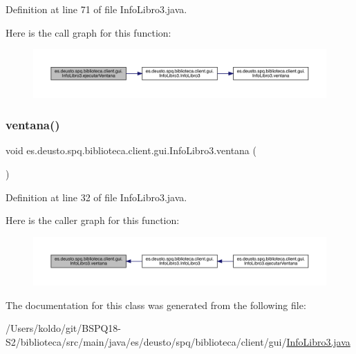 Definition at line 71 of file Info\+Libro3.\+java.

Here is the call graph for this function\+:
\nopagebreak
\begin{figure}[H]
\begin{center}
\leavevmode
\includegraphics[width=350pt]{classes_1_1deusto_1_1spq_1_1biblioteca_1_1client_1_1gui_1_1_info_libro3_a688fb88d1ba1c2b6fb5e48e786dfd0e4_cgraph}
\end{center}
\end{figure}
\mbox{\label{classes_1_1deusto_1_1spq_1_1biblioteca_1_1client_1_1gui_1_1_info_libro3_a923986e267f32a335e7d675c68926277}} 
\subsubsection{\texorpdfstring{ventana()}{ventana()}}
{\footnotesize\ttfamily void es.\+deusto.\+spq.\+biblioteca.\+client.\+gui.\+Info\+Libro3.\+ventana (\begin{DoxyParamCaption}{ }\end{DoxyParamCaption})}



Definition at line 32 of file Info\+Libro3.\+java.

Here is the caller graph for this function\+:
\nopagebreak
\begin{figure}[H]
\begin{center}
\leavevmode
\includegraphics[width=350pt]{classes_1_1deusto_1_1spq_1_1biblioteca_1_1client_1_1gui_1_1_info_libro3_a923986e267f32a335e7d675c68926277_icgraph}
\end{center}
\end{figure}


The documentation for this class was generated from the following file\+:\begin{DoxyCompactItemize}
\item 
/\+Users/koldo/git/\+B\+S\+P\+Q18-\/\+S2/biblioteca/src/main/java/es/deusto/spq/biblioteca/client/gui/\mbox{\hyperlink{_info_libro3_8java}{Info\+Libro3.\+java}}\end{DoxyCompactItemize}
